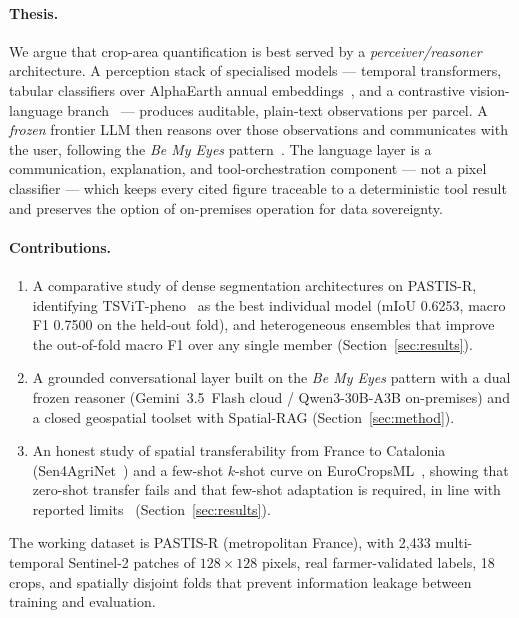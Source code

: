 \paragraph{Thesis.}
We argue that crop-area quantification is best served by a
\emph{perceiver/reasoner} architecture. A perception stack of
specialised models --- temporal transformers, tabular classifiers over
AlphaEarth annual embeddings~\cite{brown2025alphaearth}, and a
contrastive vision-language branch~\cite{li2025farslip} --- produces
auditable, plain-text observations per parcel. A \emph{frozen} frontier
LLM then reasons over those observations and communicates with the
user, following the \emph{Be My Eyes}
pattern~\cite{huang2025bemyeyes}. The language layer is a
communication, explanation, and tool-orchestration component --- not a
pixel classifier --- which keeps every cited figure traceable to a
deterministic tool result and preserves the option of on-premises
operation for data sovereignty.

\paragraph{Contributions.}
\begin{enumerate}[leftmargin=*]
    \item A comparative study of dense segmentation architectures on
    PASTIS-R, identifying TSViT-pheno~\cite{tarasiou2023tsvit} as the
    best individual model (mIoU 0.6253, macro F1 0.7500 on the
    held-out fold), and heterogeneous ensembles that improve the
    out-of-fold macro F1 over any single member
    (Section~\ref{sec:results}).
    \item A grounded conversational layer built on the \emph{Be My
    Eyes} pattern with a dual frozen reasoner (Gemini~3.5~Flash cloud /
    Qwen3-30B-A3B on-premises) and a closed geospatial toolset with
    Spatial-RAG (Section~\ref{sec:method}).
    \item An honest study of spatial transferability from France to
    Catalonia (Sen4AgriNet~\cite{sykas2022sen4agrinet}) and a few-shot
    $k$-shot curve on EuroCropsML~\cite{reuss2025eurocropsml},
    showing that zero-shot transfer fails and that few-shot adaptation
    is required, in line with reported
    limits~\cite{harvesting2026alphaearth}
    (Section~\ref{sec:results}).
\end{enumerate}

The working dataset is PASTIS-R (metropolitan France), with 2{,}433
multi-temporal Sentinel-2 patches of $128\times128$ pixels, real
farmer-validated labels, 18 crops, and spatially disjoint folds that
prevent information leakage between training and evaluation.
